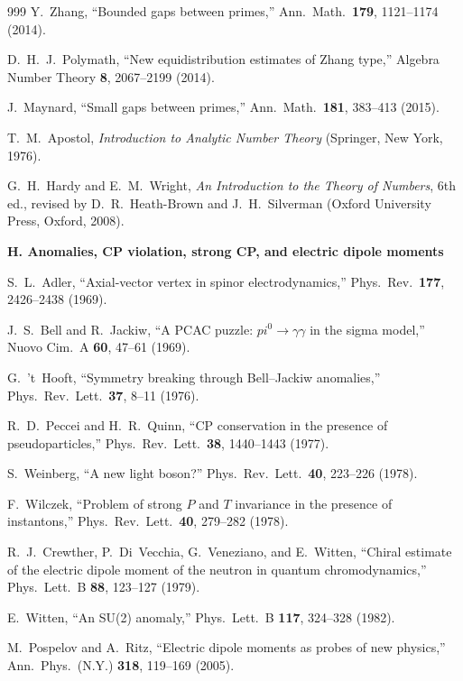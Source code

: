 \documentclass[11pt,a4paper,twoside]{book}
\def\pi{pi}%
\theoremstyle{definition}
\begin{document}
\begin{thebibliography}{999}
Y.~Zhang,
``Bounded gaps between primes,''
Ann.\ Math.\ \textbf{179}, 1121--1174 (2014).

D.~H.~J.~Polymath,
``New equidistribution estimates of Zhang type,''
Algebra Number Theory \textbf{8}, 2067--2199 (2014).

J.~Maynard,
``Small gaps between primes,''
Ann.\ Math.\ \textbf{181}, 383--413 (2015).

T.~M.~Apostol,
\emph{Introduction to Analytic Number Theory}
(Springer, New York, 1976).

G.~H.~Hardy and E.~M.~Wright,
\emph{An Introduction to the Theory of Numbers}, 6th ed., revised by
D.~R.~Heath-Brown and J.~H.~Silverman
(Oxford University Press, Oxford, 2008).

\item[]\textbf{H. Anomalies, CP violation, strong CP, and electric dipole moments}

S.~L.~Adler,
``Axial-vector vertex in spinor electrodynamics,''
Phys.\ Rev.\ \textbf{177}, 2426--2438 (1969).

J.~S.~Bell and R.~Jackiw,
``A PCAC puzzle: $\pi^0\to\gamma\gamma$ in the sigma model,''
Nuovo Cim.\ A \textbf{60}, 47--61 (1969).

G.~'t~Hooft,
``Symmetry breaking through Bell--Jackiw anomalies,''
Phys.\ Rev.\ Lett.\ \textbf{37}, 8--11 (1976).

R.~D.~Peccei and H.~R.~Quinn,
``CP conservation in the presence of pseudoparticles,''
Phys.\ Rev.\ Lett.\ \textbf{38}, 1440--1443 (1977).

S.~Weinberg,
``A new light boson?'' Phys.\ Rev.\ Lett.\ \textbf{40}, 223--226 (1978).

F.~Wilczek,
``Problem of strong $P$ and $T$ invariance in the presence of instantons,''
Phys.\ Rev.\ Lett.\ \textbf{40}, 279--282 (1978).

R.~J.~Crewther, P.~Di~Vecchia, G.~Veneziano, and E.~Witten,
``Chiral estimate of the electric dipole moment of the neutron in quantum
chromodynamics,'' Phys.\ Lett.\ B \textbf{88}, 123--127 (1979).

E.~Witten,
``An SU(2) anomaly,'' Phys.\ Lett.\ B \textbf{117}, 324--328 (1982).

M.~Pospelov and A.~Ritz,
``Electric dipole moments as probes of new physics,''
Ann.\ Phys.\ (N.Y.) \textbf{318}, 119--169 (2005).


\end{thebibliography}
\end{document}

